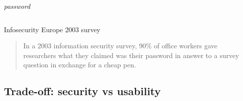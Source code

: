 \begin{frame}
\begin{columns}
\begin{column}{0.4\linewidth}
\Large
\centering
\emph{password}
\end{column}
\begin{column}{0.2\linewidth}
\end{column}
\begin{column}{0.4\linewidth}
\end{column}
\pause
\end{columns}
\begin{exampleblock}{Infosecurity Europe 2003 survey}
\begin{quote}
In a 2003 information security survey, {\Large 90\%} of office workers gave
researchers what they claimed was their {\Large password} in answer to a
survey question in exchange for a {\Large cheap pen}.
\end{quote}
\end{exampleblock}
\end{frame}

\subsection{Trade-off: security vs usability}

